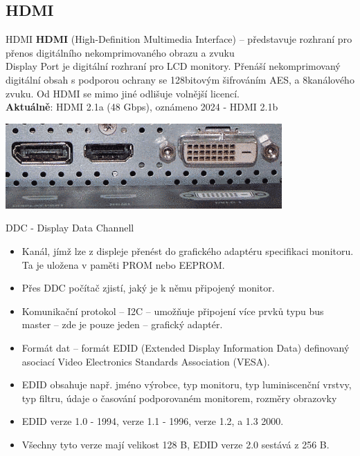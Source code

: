 \documentclass[aspectratio=43]{beamer}
\begin{document}
\subsection{HDMI}

\begin{frame}{HDMI}
	\textbf{HDMI} (High-Definition Multimedia Interface) – představuje 
	rozhraní pro přenos digitálního nekomprimovaného obrazu a 
	zvuku\\
	Display Port je digitální rozhraní pro LCD monitory. 
	Přenáší nekomprimovaný  digitální obsah s podporou ochrany se 
	128bitovým šifrováním AES, a 8kanálového zvuku. 
	Od HDMI  se mimo jiné  odlišuje  volnější  licencí.\\
    \textbf{Aktuálně}: HDMI 2.1a (48 Gbps), oznámeno 2024 - HDMI 2.1b
	
	\begin{center}
		\includegraphics[width=0.8\linewidth]{extrahovane_obrazky/img_5_page9_4.png}
	\end{center}
	
\end{frame}


\begin{frame}{DDC - Display Data Channell}
	\begin{itemize}
		\item Kanál, jímž lze z displeje přenést do grafického adaptéru specifikaci monitoru. Ta je uložena v paměti PROM nebo EEPROM.
		\item Přes DDC počítač zjistí, jaký je k němu připojený monitor.
		\item Komunikační protokol – I2C – umožňuje připojení více prvků typu bus master – zde je pouze jeden – grafický adaptér.
		\item Formát dat – formát EDID (Extended Display Information Data) definovaný asociací Video Electronics Standards Association (VESA).
		\item EDID obsahuje např. jméno výrobce, typ monitoru, typ luminiscenční vrstvy, typ filtru, údaje o časování podporovaném monitorem, rozměry obrazovky
		\item EDID verze 1.0 - 1994, verze 1.1 - 1996, verze 1.2, a 1.3 2000.
		\item Všechny tyto verze mají velikost 128 B, EDID verze 2.0 sestává z 256 B.
	\end{itemize}
	
\end{frame}
\end{document}
